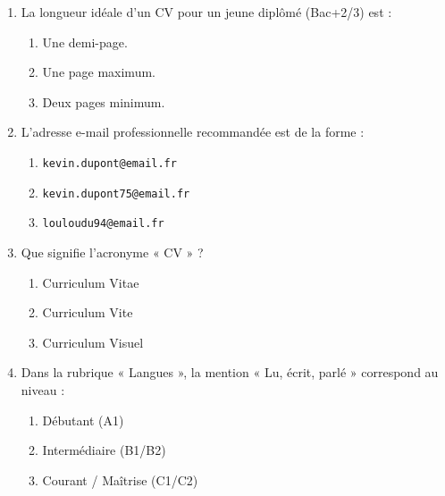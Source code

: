 \documentclass[11pt]{article}
\begin{document}
\begin{exercice}
\begin{enumerate}
    \item La longueur idéale d'un CV pour un jeune diplômé (Bac+2/3) est :
    \begin{enumerate}[label=\alph*)]
        \item Une demi-page.
        \item Une page maximum.
        \item Deux pages minimum.
    \end{enumerate}
    \item L'adresse e-mail professionnelle recommandée est de la forme :
    \begin{enumerate}[label=\alph*)]
        \item \texttt{kevin.dupont@email.fr}
        \item \texttt{kevin.dupont75@email.fr}
        \item \texttt{louloudu94@email.fr}
    \end{enumerate}
    \item Que signifie l'acronyme « CV » ?
    \begin{enumerate}[label=\alph*)]
        \item Curriculum Vitae
        \item Curriculum Vite
        \item Curriculum Visuel
    \end{enumerate}
    \item Dans la rubrique « Langues », la mention « Lu, écrit, parlé » correspond au niveau :
    \begin{enumerate}[label=\alph*)]
        \item Débutant (A1)
        \item Intermédiaire (B1/B2)
        \item Courant / Maîtrise (C1/C2)
    \end{enumerate}
\end{enumerate}
\end{exercice}
\end{document}
